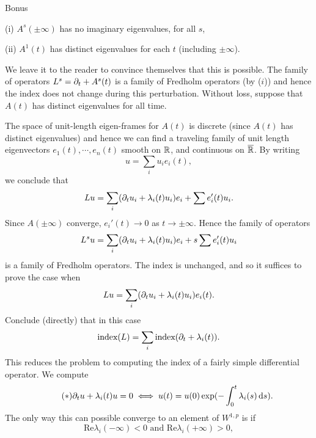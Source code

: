 \documentclass{amsart}
\begin{document}
\begin{clear}{Bonus}
\begin{xca}
  (i) $A^{s}(\pm \infty)$ has no imaginary eigenvalues, for all $s$,

  (ii) $A^{1}(t)$ has distinct eigenvalues for each $t$ (including $\pm\infty$).

  We leave it to the reader to convince themselves that this is
  possible. The family of operators $L^{s}=\partial_{t}+A^{s}(t)$ is a
  family of Fredholm operators (by ($i$)) and hence the index does not
  change during this perturbation. Without loss, suppose that $A(t)$
  has distinct eigenvalues for all time.

  The space of unit-length eigen-frames for $A(t)$ is discrete (since
  $A(t)$ has distinct eigenvalues) and hence we can find a traveling
  family of unit length eigenvectors $e_{1}(t),\cdots,e_{n}(t)$ smooth on $\mathbb{R}$,
  and continuous on $\overline{\mathbb{R}}$. By writing
  \begin{equation*}
    u=\sum_{i}u_{i}e_{i}(t),
  \end{equation*}
  we conclude that
  \begin{equation*}
    Lu=\sum_{i}(\partial_{t}u_{i}+\lambda_{i}(t)u_{i})e_{i}+\sum e_{i}'(t)u_{i}.
  \end{equation*}
  Since $A(\pm\infty)$ converge, $e_{i}'(t)\to 0$ as
  $t\to\pm\infty$. Hence the family of operators
  \begin{equation*}
    L^{s}u=\sum_{i}(\partial_{t}u_{i}+\lambda_{i}(t)u_{i})e_{i}+s\sum e_{i}'(t)u_{i}
  \end{equation*}
  is a family of Fredholm operators. The index is unchanged, and so it
  suffices to prove the case when
  \begin{equation*}
    Lu=\sum_{i}(\partial_{t}u_{i}+\lambda_{i}(t)u_{i})e_{i}(t).
  \end{equation*}
  Conclude (directly) that in this case
  \begin{equation*}
    \text{index}(L)=\sum_{i}\text{index}(\partial_{t}+\lambda_{i}(t)).
  \end{equation*}
  This reduces the problem to computing the index of a fairly simple
  differential operator. We compute
  \begin{equation*}\tag{$\ast$}
    \partial_{t}u+\lambda_{i}(t)u=0\iff
    u(t)=u(0)\exp(-\int_{0}^{t}\lambda_{i}(s)\,\mathrm{d} s).
  \end{equation*}
  The only way this can possible converge to an element of $W^{1,p}$
  is if
  \begin{equation*}
    \text{Re}\lambda_{i}(-\infty)<0\text{ and }\text{Re}\lambda_{i}(+\infty)>0,
  \end{equation*}

\end{xca}
\end{clear}
\end{document}
